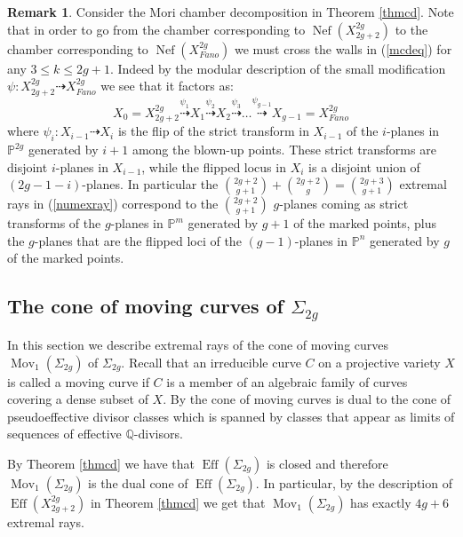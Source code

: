 \documentclass[a4paper,10pt]{amsart}
\theoremstyle{definition}
\newtheorem{Remark}[thm]{Remark}
\DeclareMathOperator{\Eff}{Eff}
\DeclareMathOperator{\Nef}{Nef}
\DeclareMathOperator{\Mov}{Mov}
\begin{document}
\begin{Remark}\label{flips}
Consider the Mori chamber decomposition in Theorem \ref{thmcd}. Note that in order to go from the chamber corresponding to $\Nef(X^{2g}_{2g+2})$ to the chamber corresponding to $\Nef(X^{2g}_{Fano})$ we must cross the walls in (\ref{mcdeq}) for any $3\leq k\leq 2g+1$. Indeed by the modular description of the small modification $\psi:X^{2g}_{2g+2}\dasharrow X^{2g}_{Fano}$ we see that it factors as:
$$X_0 = X^{2g}_{2g+2} \stackrel{\psi_1}{\dasharrow} X_1\stackrel{\psi_2}{\dasharrow} X_2\stackrel{\psi_3}{\dasharrow}\dots\stackrel{\psi_{g-1}}{\dasharrow}X_{g-1} = X^{2g}_{Fano}$$
where $\psi_i:X_{i-1}\dasharrow X_{i}$ is the flip of the strict transform in $X_{i-1}$ of the $i$-planes in $\mathbb{P}^{2g}$ generated by $i+1$ among the blown-up points. These strict transforms are disjoint $i$-planes in $X_{i- 1}$, while the flipped locus in $X_i$ is a disjoint union of $(2g-1-i)$-planes. In particular the $\binom{2g+2}{g+1}+\binom{2g+2}{g} = \binom{2g+3}{g+1}$ extremal rays in (\ref{numexray}) correspond to the $\binom{2g+2}{g+1}$ $g$-planes coming as strict transforms of the $g$-planes in $\mathbb{P}^m$ generated by $g+1$ of the marked points, plus the $g$-planes that are the flipped loci of the $(g-1)$-planes in $\mathbb{P}^n$ generated by $g$ of the marked points.
\end{Remark}

\subsection{The cone of moving curves of $\Sigma_{2g}$}
In this section we describe extremal rays of the cone of moving curves $\Mov_1(\Sigma_{2g})$ of $\Sigma_{2g}$. Recall that an irreducible curve $C$ on a projective variety $X$ is called a moving
curve if $C$ is a member of an algebraic family of curves covering a dense subset of $X$. By \cite[Theorems 2.2 and 2.4]{BDPP13} the cone of moving curves is dual to the cone of pseudoeffective divisor classes which is spanned by classes that appear as limits of sequences of effective $\mathbb{Q}$-divisors.

By Theorem \ref{thmcd} we have that $\Eff(\Sigma_{2g})$ is closed and therefore $\Mov_1(\Sigma_{2g})$ is the dual cone of $\Eff(\Sigma_{2g})$. In particular, by the description of $\Eff(X^{2g}_{2g+2})$ in Theorem \ref{thmcd} we get that $\Mov_1(\Sigma_{2g})$ has exactly $4g+6$ extremal rays. 
\end{document}
